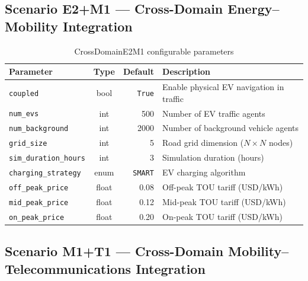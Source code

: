 \subsection*{Scenario E2+M1 --- Cross-Domain Energy--Mobility Integration}

\begin{table}[h]
    \centering
    \caption{CrossDomainE2M1 configurable parameters}
    \label{tab:params-e2m1}
    \small
    \begin{tabular}{|l|c|r|p{5.5cm}|}
        \hline
        \textbf{Parameter} & \textbf{Type} & \textbf{Default} & \textbf{Description} \\
        \hline
        \texttt{coupled}                & bool  & \texttt{True}   & Enable physical EV navigation in traffic \\
        \hline
        \texttt{num\_evs}               & int   & 500    & Number of EV traffic agents \\
        \hline
        \texttt{num\_background}        & int   & 2000   & Number of background vehicle agents \\
        \hline
        \texttt{grid\_size}             & int   & 5      & Road grid dimension ($N \times N$ nodes) \\
        \hline
        \texttt{sim\_duration\_hours}   & int   & 3      & Simulation duration (hours) \\
        \hline
        \texttt{charging\_strategy}     & enum  & \texttt{SMART}  & EV charging algorithm \\
        \hline
        \texttt{off\_peak\_price}       & float & 0.08   & Off-peak TOU tariff (USD/kWh) \\
        \hline
        \texttt{mid\_peak\_price}       & float & 0.12   & Mid-peak TOU tariff (USD/kWh) \\
        \hline
        \texttt{on\_peak\_price}        & float & 0.20   & On-peak TOU tariff (USD/kWh) \\
        \hline
    \end{tabular}
\end{table}

\subsection*{Scenario M1+T1 --- Cross-Domain Mobility--Telecommunications Integration}

